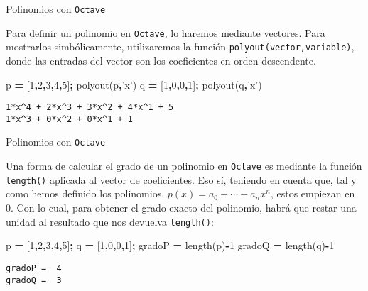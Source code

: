 \documentclass[
  ignorenonframetext,
]{beamer}
\newenvironment{Shaded}{\begin{snugshade}}{\end{snugshade}}
\newcommand{\FloatTok}[1]{\textcolor[rgb]{0.00,0.00,0.81}{#1}}
\newcommand{\FunctionTok}[1]{\textcolor[rgb]{0.00,0.00,0.00}{#1}}
\newcommand{\NormalTok}[1]{#1}
\newcommand{\OperatorTok}[1]{\textcolor[rgb]{0.81,0.36,0.00}{\textbf{#1}}}
\newcommand{\StringTok}[1]{\textcolor[rgb]{0.31,0.60,0.02}{#1}}
\begin{document}
\begin{frame}[fragile]{Polinomios con \texttt{Octave}}
\protect\hypertarget{polinomios-con-octave-1}{}

Para definir un polinomio en \texttt{Octave}, lo haremos mediante
vectores. Para mostrarlos simbólicamente, utilizaremos la función
\texttt{polyout(vector,\textquotesingle{}variable\textquotesingle{})},
donde las entradas del vector son los coeficientes en orden descendente.

\begin{Shaded}
\begin{Highlighting}[]
\NormalTok{p }\OperatorTok{=}\NormalTok{ [}\FloatTok{1}\OperatorTok{,}\FloatTok{2}\OperatorTok{,}\FloatTok{3}\OperatorTok{,}\FloatTok{4}\OperatorTok{,}\FloatTok{5}\NormalTok{]}\OperatorTok{;} 
\FunctionTok{polyout}\NormalTok{(p}\OperatorTok{,}\StringTok{'x'}\NormalTok{) }
\NormalTok{q }\OperatorTok{=}\NormalTok{ [}\FloatTok{1}\OperatorTok{,}\FloatTok{0}\OperatorTok{,}\FloatTok{0}\OperatorTok{,}\FloatTok{1}\NormalTok{]}\OperatorTok{;}
\FunctionTok{polyout}\NormalTok{(q}\OperatorTok{,}\StringTok{'x'}\NormalTok{)}
\end{Highlighting}
\end{Shaded}

\begin{verbatim}
1*x^4 + 2*x^3 + 3*x^2 + 4*x^1 + 5
1*x^3 + 0*x^2 + 0*x^1 + 1
\end{verbatim}

\end{frame}

\begin{frame}[fragile]{Polinomios con \texttt{Octave}}
\protect\hypertarget{polinomios-con-octave-2}{}

Una forma de calcular el grado de un polinomio en \texttt{Octave} es
mediante la función \texttt{length()} aplicada al vector de
coeficientes. Eso sí, teniendo en cuenta que, tal y como hemos definido
los polinomios, \(p(x)=a_0+\cdots+a_nx^n\), estos empiezan en 0. Con lo
cual, para obtener el grado exacto del polinomio, habrá que restar una
unidad al resultado que nos devuelva \texttt{length()}:

\begin{Shaded}
\begin{Highlighting}[]
\NormalTok{p }\OperatorTok{=}\NormalTok{ [}\FloatTok{1}\OperatorTok{,}\FloatTok{2}\OperatorTok{,}\FloatTok{3}\OperatorTok{,}\FloatTok{4}\OperatorTok{,}\FloatTok{5}\NormalTok{]}\OperatorTok{;} 
\NormalTok{q }\OperatorTok{=}\NormalTok{ [}\FloatTok{1}\OperatorTok{,}\FloatTok{0}\OperatorTok{,}\FloatTok{0}\OperatorTok{,}\FloatTok{1}\NormalTok{]}\OperatorTok{;}
\NormalTok{gradoP }\OperatorTok{=} \FunctionTok{length}\NormalTok{(p)}\OperatorTok{-}\FloatTok{1}
\NormalTok{gradoQ }\OperatorTok{=} \FunctionTok{length}\NormalTok{(q)}\OperatorTok{-}\FloatTok{1}
\end{Highlighting}
\end{Shaded}

\begin{verbatim}
gradoP =  4
gradoQ =  3
\end{verbatim}

\end{frame}
\end{document}
